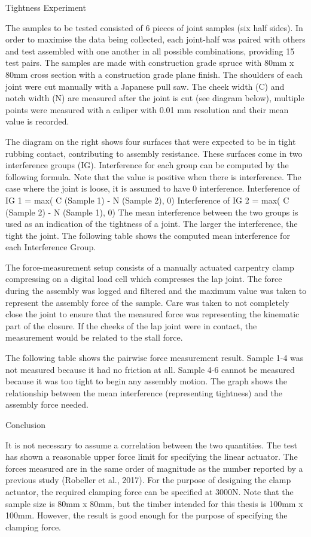 Tightness Experiment

The samples to be tested consisted of 6 pieces of joint samples (six half sides). In order to maximise the data being collected, each joint-half was paired with others and test assembled with one another in all possible combinations, providing 15 test pairs.
The samples are made with construction grade spruce with 80mm x 80mm cross section with a construction grade plane finish. The shoulders of each joint were cut manually with a Japanese pull saw. The cheek width (C) and notch width (N) are measured after the joint is cut (see diagram below), multiple points were measured with a caliper with 0.01 mm resolution and their mean value is recorded.

The diagram on the right shows four surfaces that were expected to be in tight rubbing contact, contributing to assembly resistance. These surfaces come in two interference groups (IG). Interference for each group can be computed by the following formula. Note that the value is positive when there is interference. The case where the joint is loose, it is assumed to have 0 interference. 
Interference of IG 1 = max( C (Sample 1) - N (Sample 2), 0)
Interference of IG 2 = max( C (Sample 2) - N (Sample 1), 0)
The mean interference between the two groups is used as an indication of the tightness of a joint. The larger the interference, the tight the joint. The following table shows the computed mean interference for each Interference Group.

The force-measurement setup consists of a manually actuated carpentry clamp compressing on a digital load cell which compresses the lap joint. The force during the assembly was logged and filtered and the maximum value was taken to represent the assembly force of the sample. Care was taken to not completely close the joint to ensure that the measured force was representing the kinematic part of the closure. If the cheeks of the lap joint were in contact, the measurement would be related to the stall force.

The following table shows the pairwise force measurement result. Sample 1-4 was not measured because it had no friction at all. Sample 4-6 cannot be measured because it was too tight to begin any assembly motion. The graph shows the relationship between the mean interference (representing tightness) and the assembly force needed. 

Conclusion

It is not necessary to assume a correlation between the two quantities. The test has shown a reasonable upper force limit for specifying the linear actuator. The forces measured are in the same order of magnitude as the number reported by a previous study (Robeller et al., 2017). For the purpose of designing the clamp actuator, the required clamping force can be specified at 3000N. 
Note that the sample size is 80mm x 80mm, but the timber intended for this thesis is 100mm x 100mm. However, the result is good enough for the purpose of specifying the clamping force.

